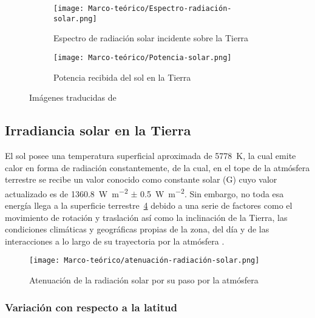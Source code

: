 		\begin{figure}[H]
			\centering
			\begin{subfigure}{\linewidth}
				\centering
				\texttt{[image: Marco-teórico/Espectro-radiación-solar.png]}
				\caption{Espectro de radiación solar incidente sobre la Tierra}
				\label{fig:Espectro-radiación-solar}
			\end{subfigure}
			\begin{subfigure}{\linewidth}
				\centering
				\texttt{[image: Marco-teórico/Potencia-solar.png]}
				\caption{Potencia recibida del sol en la Tierra}
				\label{fig:Potencia-solar}
			\end{subfigure}
			\caption{Imágenes traducidas de \cite{weinstein_spectral_nodate}}
			\label{fig:solar-spectrum-brilliant}
		\end{figure}
		
		
	
	\subsection{Irradiancia solar en la Tierra}\label{sec:Irradiancia-Tierra}
	
		El sol posee una temperatura superficial aproximada de \SI{5778}{\kelvin}, la cual emite calor en forma de radiación constantemente, de la cual, en el tope de la atmósfera terrestre se recibe un valor conocido como constante solar (\gls{G}) cuyo valor actualizado es de \SI{1360.8}{\watt\per\m\tothe{2}} $\pm$ \SI{0.5}{\watt\per\m\tothe{2}}. Sin embargo, no toda esa energía llega a la superficie terrestre~\cref{fig:atenuación-radiación-solar} debido a una serie de factores como el movimiento de rotación y traslación así como la inclinación de la Tierra, las condiciones climáticas y geográficas propias de la zona, del día  y de las interacciones a lo largo de su trayectoria por la atmósfera \cite{garcia_valladares_aplicaciones_2017}.
		
		\begin{figure}[H]
			\centering
			\texttt{[image: Marco-teórico/atenuación-radiación-solar.png]}
			\caption{Atenuación de la radiación solar por su paso por la atmósfera}
			\label{fig:atenuación-radiación-solar}
		\end{figure}
		
		\subsubsection{Variación con respecto a la latitud}
			
